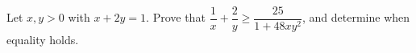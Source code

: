 Let $x,y>0$ with $x+2y=1$. Prove that $\dfrac{1}{x}+\dfrac{2}{y}\ge\dfrac{25}{1+48xy^2}$, and determine when equality holds.

